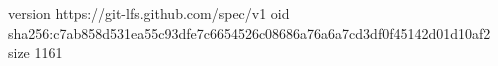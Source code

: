 version https://git-lfs.github.com/spec/v1
oid sha256:c7ab858d531ea55c93dfe7c6654526c08686a76a6a7cd3df0f45142d01d10af2
size 1161

